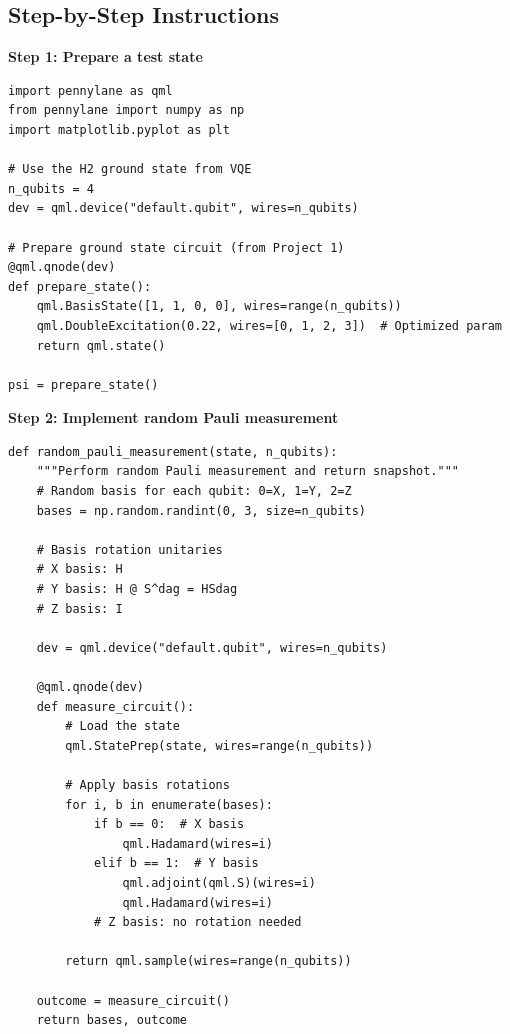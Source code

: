 \documentclass[11pt,a4paper]{article}
\begin{document}
\subsection*{Step-by-Step Instructions}

\textbf{Step 1: Prepare a test state}
\begin{lstlisting}
import pennylane as qml
from pennylane import numpy as np
import matplotlib.pyplot as plt

# Use the H2 ground state from VQE
n_qubits = 4
dev = qml.device("default.qubit", wires=n_qubits)

# Prepare ground state circuit (from Project 1)
@qml.qnode(dev)
def prepare_state():
    qml.BasisState([1, 1, 0, 0], wires=range(n_qubits))
    qml.DoubleExcitation(0.22, wires=[0, 1, 2, 3])  # Optimized param
    return qml.state()

psi = prepare_state()
\end{lstlisting}

\textbf{Step 2: Implement random Pauli measurement}
\begin{lstlisting}
def random_pauli_measurement(state, n_qubits):
    """Perform random Pauli measurement and return snapshot."""
    # Random basis for each qubit: 0=X, 1=Y, 2=Z
    bases = np.random.randint(0, 3, size=n_qubits)
    
    # Basis rotation unitaries
    # X basis: H
    # Y basis: H @ S^dag = HSdag
    # Z basis: I
    
    dev = qml.device("default.qubit", wires=n_qubits)
    
    @qml.qnode(dev)
    def measure_circuit():
        # Load the state
        qml.StatePrep(state, wires=range(n_qubits))
        
        # Apply basis rotations
        for i, b in enumerate(bases):
            if b == 0:  # X basis
                qml.Hadamard(wires=i)
            elif b == 1:  # Y basis
                qml.adjoint(qml.S)(wires=i)
                qml.Hadamard(wires=i)
            # Z basis: no rotation needed
        
        return qml.sample(wires=range(n_qubits))
    
    outcome = measure_circuit()
    return bases, outcome
\end{lstlisting}
\end{document}
